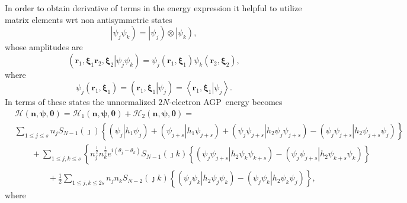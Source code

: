 \documentclass[aps,preprint]{revtex4}%
\begin{document}
In order to obtain derivative of terms in the energy expression it helpful to
utilize matrix elements wrt non antisymmetric states
\begin{equation}
\left\vert \psi_{j}\psi_{k}\right)  =\left\vert \psi_{j}\right)
\otimes\left\vert \psi_{k}\right)  ,
\end{equation}
whose amplitudes are
\begin{equation}
\left(  \left.  \mathbf{r}_{1}\mathbf{,\xi}_{1}\mathbf{r}_{2}\mathbf{,\xi}%
_{2}\right\vert \psi_{j}\psi_{k}\right)  =\psi_{j}\left(  \mathbf{r}%
_{1}\mathbf{,\xi}_{1}\right)  \psi_{k}\left(  \mathbf{r}_{2}\mathbf{,\xi}%
_{2}\right)  ,
\end{equation}
where
\begin{equation}
\psi_{j}\left(  \mathbf{r}_{1}\mathbf{,\xi}_{1}\right)  =\left(  \left.
\mathbf{r}_{1}\mathbf{,\xi}_{1}\right\vert \psi_{j}\right)  =\left\langle
\left.  \mathbf{r}_{1}\mathbf{,\xi}_{1}\right\vert \psi_{j}\right\rangle .
\end{equation}
In terms of these states the unnormalized $2N$-electron AGP\ energy becomes
\begin{align}
&  \mathcal{H}\left(  \mathbf{n},\mathbf{\psi},\mathbf{\theta}\right)
=\mathcal{H}_{1}\left(  \mathbf{n},\mathbf{\psi},\mathbf{\theta}\right)
+\mathcal{H}_{2}\left(  \mathbf{n},\mathbf{\psi},\mathbf{\theta}\right)
=\nonumber\\
&  \sum_{1\leq j\leq s}n_{j}S_{N-1}\left(  \jmath\right)  \left\{  \left(
\left.  \psi_{j}\right\vert h_{1}\psi_{j}\right)  +\left(  \left.  \psi
_{j+s}\right\vert h_{1}\psi_{j+s}\right)  +\left(  \left.  \psi_{j}\psi
_{j+s}\right\vert h_{2}\psi_{j}\psi_{j+s}\right)  -\left(  \left.  \psi
_{j}\psi_{j+s}\right\vert h_{2}\psi_{j+s}\psi_{j}\right)  \right\} \nonumber\\
&  \qquad+\sum_{1\leq j,k\leq s}\left\{  n_{j}^{\frac{1}{2}}n_{k}^{\frac{1}%
{2}}e^{i\left(  \theta_{j}-\theta_{k}\right)  }S_{N-1}\left(  \jmath k\right)
\left\{  \left(  \left.  \psi_{j}\psi_{j+s}\right\vert h_{2}\psi_{k}\psi
_{k+s}\right)  -\left(  \left.  \psi_{j}\psi_{j+s}\right\vert h_{2}\psi
_{k+s}\psi_{k}\right)  \right\}  \right. \nonumber\\
&  \qquad\qquad+\frac{1}{2}\sum_{1\leq j,k\leq2s}n_{j}n_{k}S_{N-2}\left(
\jmath k\right)  \overset{}{\left\{  \left(  \left.  \psi_{j}\psi
_{k}\right\vert h_{2}\psi_{j}\psi_{k}\right)  -\left(  \left.  \psi_{j}%
\psi_{k}\right\vert h_{2}\psi_{k}\psi_{j}\right)  \right\}  }, \label{unnormE}%
\end{align}
where
\end{document}
